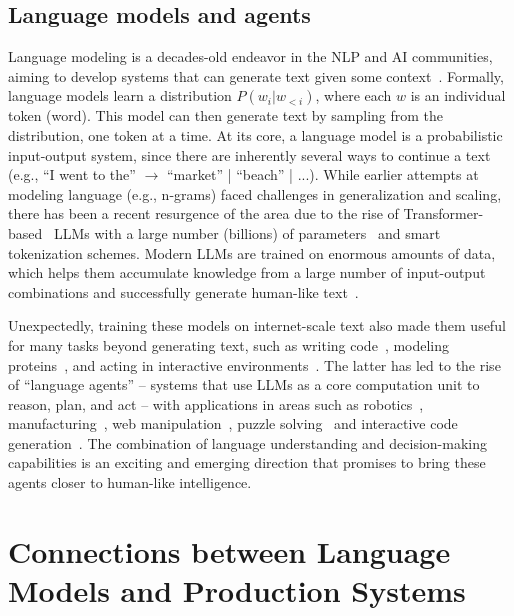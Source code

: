 \documentclass[10pt]{article} %
\begin{document}
\subsection{Language models and agents}
Language modeling is a decades-old endeavor in the NLP and AI communities, aiming to develop systems that can generate text given some context~\citep{jurafsky2000speech}. Formally, language models learn a distribution $P(w_i | w_{<i})$, where each $w$ is an individual token (word). This model can then generate text by sampling from the distribution, one token at a time. At its core, a language model is a probabilistic input-output system, since there are inherently several ways to continue a text (e.g., ``I went to the'' $\rightarrow$ ``market'' | ``beach'' | ...). While earlier attempts at modeling language (e.g., n-grams) faced challenges in generalization and scaling, there has been a recent resurgence of the area due to the rise of Transformer-based~\citep{vaswani2017attention} LLMs with a large number (billions) of parameters~\citep[e.g., GPT-4;][]{OpenAI2023GPT4TR} and smart tokenization schemes. Modern LLMs are trained on enormous amounts of data, which helps them accumulate knowledge from a large number of input-output combinations and successfully generate human-like text~\citep{andreas2022language}. 

Unexpectedly, training these models on internet-scale text also made them useful for many tasks beyond generating text, such as writing code~\citep{Li2022CompetitionlevelCG,Rozire2023CodeLO,Li2023StarCoderMT}, modeling proteins~\citep{Meier2021LanguageME}, and acting in interactive environments~\citep{yao2022react, nakano2021webgpt}. The latter has led to the rise of ``language agents'' -- systems that use LLMs as a core computation unit to reason, plan, and act -- with applications in areas such as robotics~\citep{ahn2022can}, manufacturing~\citep{xia2023towards}, web manipulation~\citep{yao2022webshop,deng2023mind2web}, puzzle solving~\citep{yao2023tree,hao2023reasoning} and interactive code generation~\citep{yang2023intercode}. The combination of language understanding and decision-making capabilities is an exciting and emerging direction that promises to bring these agents closer to human-like intelligence. 


\section{Connections between Language Models and Production Systems}
\label{sec:analogy}
\end{document}
